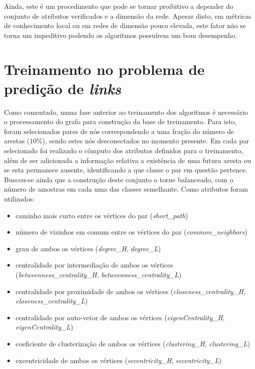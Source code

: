 \documentclass[a4paper,11pt]{article}
\begin{document}
Ainda, este é um procedimento que pode se tornar proibitivo a depender do conjunto de atributos verificados e a dimensão da rede. Apesar disto, em métricas de conhecimento local ou em redes de dimensão pouco elevada, este fator não se torna um impeditivo podendo os algoritmos possuírem um bom desempenho.

\vspace{0.5cm}

\section{Treinamento no problema de predição de \textit{links}}

\vspace{0.5cm}


Como comentado, numa fase anterior ao treinamento dos algoritmos é necessário o processamento do grafo para construção da base de treinamento. Para isto, foram selecionados pares de nós correspondendo a uma fração do número de arestas ($10 \%$), sendo estes nós desconectados no momento presente. Em cada par selecionado foi realizado o cômputo dos atributos definidos para o treinamento, além de ser adicionada a informação relativa a existência de uma futura aresta ou se esta permanece ausente, identificando a que classe o par em questão pertence.
Buscou-se ainda que a construção deste conjunto o torne balanceado, com o número de amostras em cada uma das classes semelhante. 
Como atributos foram utilizados: 

\begin{itemize}
	\item caminho mais curto entre os vértices do par (\textit{short\_path})
	\item número de vizinhos em comum entre os vértices do par (\textit{common\_neighbors})
	\item grau de ambos os vértices (\textit{degree\_H}, \textit{degree\_L})
	\item centralidade por intermediação de ambos os vértices (\textit{betweenness\_centrality\_H}, \textit{betweenness\_centrality\_L})
	\item centralidade por proximidade de ambos os vértices (\textit{closeness\_centrality\_H}, \textit{closeness\_centrality\_L})
	\item centralidade por auto-vetor de ambos os vértices (\textit{eigenCentrality\_H}, \textit{eigenCentrality\_L})
	\item coeficiente de clusterização de ambos os vértices (\textit{clustering\_H}, \textit{clustering\_L})
	\item excentricidade de ambos os vértices (\textit{eccentricity\_H}, \textit{eccentricity\_L})
\end{itemize}
\end{document}
